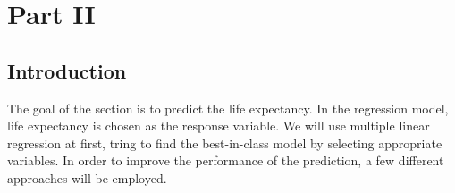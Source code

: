\newpage



\section{Part II}

\subsection{Introduction}

The goal of the section is to predict the life expectancy. In the regression model, life expectancy is chosen as the response variable. We will use multiple linear regression at first, tring to find the best-in-class model by selecting appropriate variables. In order to improve the performance of the prediction, a few different approaches will be employed.


